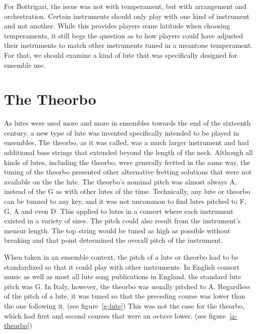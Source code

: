 For Bottrigari, the issue was not with temperament, but with arrangement and
orchestration.  Certain instruments should only play with one kind of instrument
and not another.  While this provides players some latitude when choosing temperaments,
it still begs the question as to how players could have adjusted their instruments
to match other instruments tuned in a meantone temperament.  For that, we should
examine a kind of lute that was specifically designed for ensemble use.

\section{The Theorbo}

As lutes were used more and more in ensembles towards the end of the sixteenth century, a
new type of lute was invented specifically intended to be played in ensembles.  The theorbo, as
it was called, was a much larger instrument and had additional bass strings that extended
beyond the length of the neck.  Although all kinds of lutes, including the theorbo, were
generally fretted in the same way, the tuning of the theorbo presented other alternative
fretting solutions that were not available on the the lute.  The theorbo's nominal pitch
was almost always A, instead of the G as with other lutes of the time.  Technically, any
lute or theorbo can be tunned to any key, and it was not uncommon to find lutes pitched to
F, G, A and even D.  This applied to lutes in a consort where each instrument existed in a variety of
sizes.  The pitch could also result from the instrument's mensur length.  The top string
would be tuned as high as possible without breaking and that point determined
the overall pitch of the instrument.

When taken in an ensemble context, the pitch of a lute or theorbo had to be
standardized so that it could play with other instruments.  In English consort music as
well as most all lute song publications in England, the standard lute pitch was G.
In Italy, however, the theorbo was usually pitched to A.  Regardless of the pitch of a
lute, it was tuned so that the preceding course was lower than the one
following it. (see figure~\ref{g-lute})  This was not the case for the theorbo, which
had first and second courses that were an octave lower. (see figure~\ref{a-theorbo})

